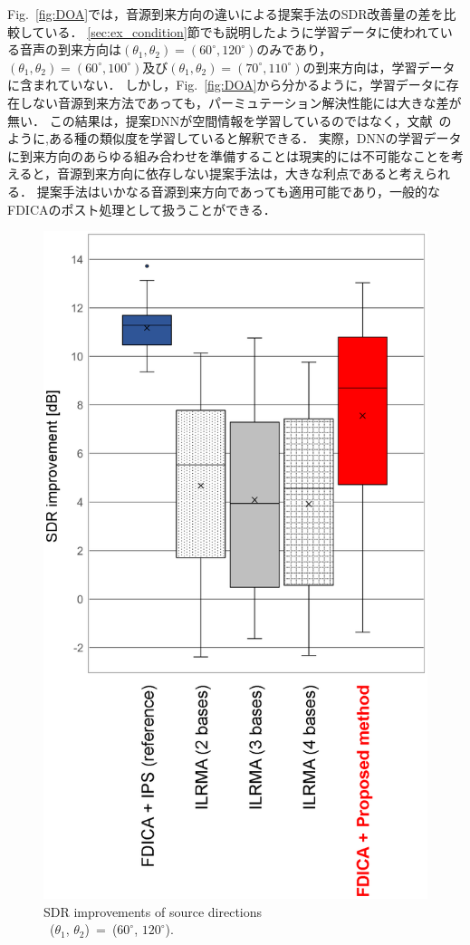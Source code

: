 Fig.~\ref{fig:DOA}では，音源到来方向の違いによる提案手法のSDR改善量の差を比較している．
\ref{sec:ex_condition}節でも説明したように学習データに使われている音声の到来方向は$(\theta_1, \theta_2)=(60^\circ, 120^\circ)$のみであり，$(\theta_1, \theta_2)=(60^\circ, 100^\circ)$及び$(\theta_1, \theta_2)=(70^\circ, 110^\circ)$の到来方向は，学習データに含まれていない．
しかし，Fig.~\ref{fig:DOA}から分かるように，学習データに存在しない音源到来方法であっても，パーミュテーション解決性能には大きな差が無い．
この結果は，提案DNNが空間情報を学習しているのではなく，文献~\cite{COR}のように,ある種の類似度を学習していると解釈できる．
実際，DNNの学習データに到来方向のあらゆる組み合わせを準備することは現実的には不可能なことを考えると，音源到来方向に依存しない提案手法は，大きな利点であると考えられる．
提案手法はいかなる音源到来方向であっても適用可能であり，一般的なFDICAのポスト処理として扱うことができる．
\clearpage
\begin{figure}[th]
    \vspace{4pt}
    \begin{center}
        \includegraphics[width=0.7\columnwidth]{figures/sdr_glaph_060-120.eps}
    \end{center}
    \vspace{-8pt}
	\caption{SDR improvements of source directions\\
	\protect\linebreak~($\theta_1$, $\theta_2$)~=~($60^\circ$, $120^\circ$).}
	\label{fig:060-120}
\end{figure}
